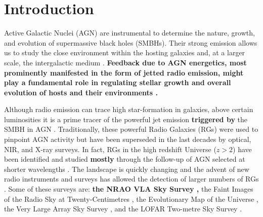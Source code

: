 \documentclass{aa}
\begin{document}

   \maketitle
%

\section{Introduction}\label{sec:introduction}

Active Galactic Nuclei (AGN) are instrumental to determine the nature, growth, and evolution of supermassive black holes (SMBHs). Their strong emission allows us to study the close environment within the hosting galaxies and, at a larger scale, the intergalactic medium \citep[e.g.][]{2017A&ARv..25....2P, 2022MNRAS.516.5775B}. \textbf{Feedback due to AGN energetics, most prominently manifested in the form of jetted radio emission, might play a fundamental role in regulating stellar growth and overall evolution of hosts and their environments \citep{2015ApJ...798...31A, 2017MNRAS.472.4659V, 2020NewAR..8801539H}.}

Although radio emission can trace high star-formation in galaxies, above certain luminosities \citep[e.g. $\mathrm{log}L_{1.4\mathrm{GHz}} {>} 25\,\mathrm{W\, Hz^{-1}}$,][]{2021MNRAS.503.1780J} it is a prime tracer of the powerful jet emission \textbf{triggered by} the SMBH in AGN \citep[Radio Galaxies,][]{2014ARA&A..52..589H}. Traditionally, these powerful Radio Galaxies (RGs) were used to pinpoint AGN activity but have been superseded in the last decades by optical, NIR, and X-ray surveys. In fact, RGs in the high redshift Universe ($z > 2$) have been identified and studied \textbf{mostly} through the follow-up of AGN selected at shorter wavelengths \citep[optical, NIR, millimetre, and X-rays, e.g.][]{2006ApJ...652..157M, 2020A&A...637A..84P, 2021MNRAS.501.3833D}.
The landscape is quickly changing and the advent of new radio instruments and surveys has allowed the detection of larger numbers of RGs \citep[e.g.][]{2018MNRAS.475.3429W, 2020A&A...642A.107C}. Some of these surveys are: \textbf{the NRAO VLA Sky Survey \citep[NVSS;][]{1998AJ....115.1693C},} the Faint Images of the Radio Sky at Twenty-Centimetres \citep[FIRST;][]{2015ApJ...801...26H}, the Evolutionary Map of the Universe \citep[EMU;][]{2011PASA...28..215N}, the Very Large Array Sky Survey \citep[VLASS;][]{2020RNAAS...4..175G}, and the LOFAR Two-metre Sky Survey \citep[LoTSS;][]{2019A&A...622A...1S}. 
\end{document}
